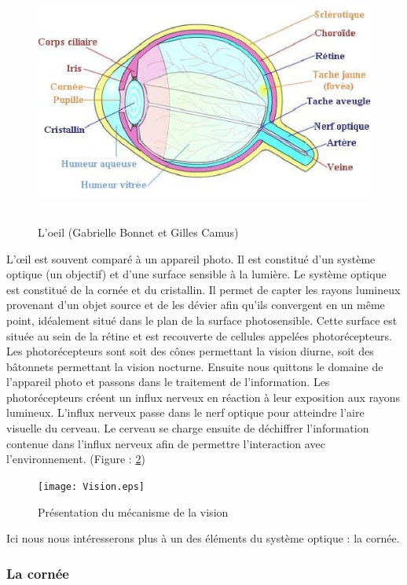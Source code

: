 \documentclass[a4paper,12pt]{article}
\begin{document}
\begin{figure}[h]
	\centering
	\includegraphics[height=8cm]{oeil.eps} 
	\caption{L'oeil (Gabrielle Bonnet et Gilles Camus)}
	\label{oeil}
\end{figure}

L’œil est souvent comparé à un appareil photo. Il est constitué d'un système optique (un objectif) et d'une surface sensible à la lumière. Le système optique est constitué de la cornée et du cristallin. Il permet de capter les rayons lumineux provenant d'un objet source et de les dévier afin qu'ils convergent en un même point, idéalement situé dans le plan de la surface photosensible. Cette surface est située au sein de la rétine et est recouverte de cellules appelées photorécepteurs. Les photorécepteurs sont soit des cônes permettant la vision diurne, soit des bâtonnets permettant la vision nocturne. Ensuite nous quittons le domaine de l'appareil photo et passons dans le traitement de l'information. Les photorécepteurs créent un influx nerveux en réaction à leur exposition aux rayons lumineux. L'influx nerveux passe dans le nerf optique pour atteindre l'aire visuelle du cerveau. Le cerveau se charge ensuite de déchiffrer l'information contenue dans l'influx nerveux afin de permettre l'interaction avec l'environnement. (Figure : \ref{fig:Vision})

\begin{figure}[h]
	\centering
	\texttt{[image: Vision.eps]} 
	\caption{Présentation du mécanisme de la vision}
	\label{fig:Vision}
\end{figure}


Ici nous nous intéresserons plus à un des éléments du système optique : la cornée.



		\subsubsection{La cornée}
\end{document}
